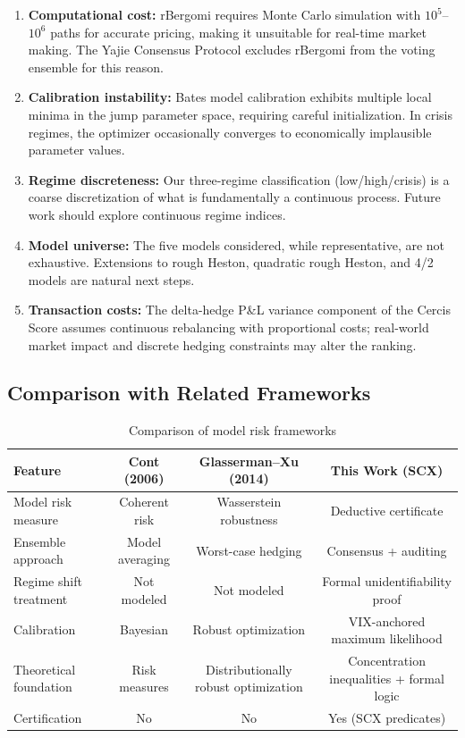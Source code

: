 \documentclass[11pt,a4paper]{article}
\theoremstyle{plain}
\theoremstyle{definition}
\theoremstyle{remark}
\begin{document}
\begin{enumerate}[label=(\roman*), leftmargin=*]
  \item \textbf{Computational cost:} rBergomi requires Monte Carlo simulation with $10^5$--$10^6$ paths for accurate pricing, making it unsuitable for real-time market making. The Yajie Consensus Protocol excludes rBergomi from the voting ensemble for this reason.
  \item \textbf{Calibration instability:} Bates model calibration exhibits multiple local minima in the jump parameter space, requiring careful initialization. In crisis regimes, the optimizer occasionally converges to economically implausible parameter values.
  \item \textbf{Regime discreteness:} Our three-regime classification (low/high/crisis) is a coarse discretization of what is fundamentally a continuous process. Future work should explore continuous regime indices.
  \item \textbf{Model universe:} The five models considered, while representative, are not exhaustive. Extensions to rough Heston, quadratic rough Heston, and 4/2 models are natural next steps.
  \item \textbf{Transaction costs:} The delta-hedge P\&L variance component of the Cercis Score assumes continuous rebalancing with proportional costs; real-world market impact and discrete hedging constraints may alter the ranking.
\end{enumerate}

\subsection{Comparison with Related Frameworks}

\begin{table}[H]
\centering
\caption{Comparison of model risk frameworks}
\label{tab:comparison}
\begin{tabular}{l|ccc}
\toprule
Feature & Cont (2006) & Glasserman--Xu (2014) & This Work (SCX) \\
\midrule
Model risk measure      & Coherent risk & Wasserstein robustness & Deductive certificate \\
Ensemble approach       & Model averaging & Worst-case hedging   & Consensus + auditing \\
Regime shift treatment  & Not modeled     & Not modeled          & Formal unidentifiability proof \\
Calibration             & Bayesian       & Robust optimization  & VIX-anchored maximum likelihood \\
Theoretical foundation  & Risk measures  & Distributionally robust optimization & Concentration inequalities + formal logic \\
Certification           & No             & No                   & Yes (SCX predicates) \\
\bottomrule
\end{tabular}
\end{table}
\end{document}
